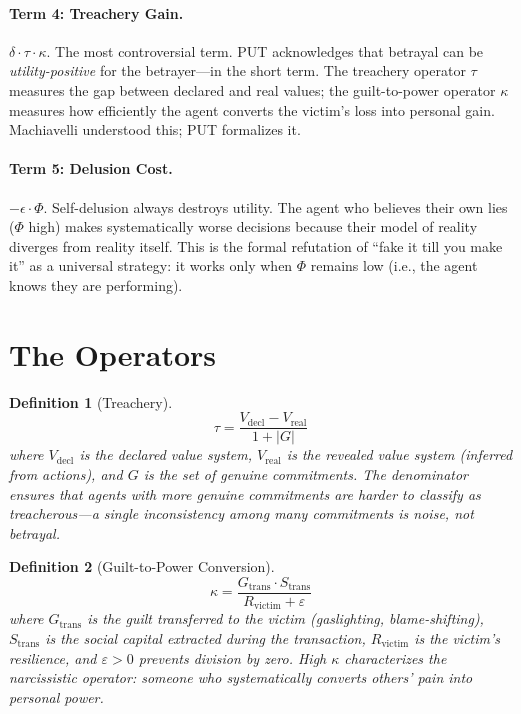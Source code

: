 \documentclass[12pt, a4paper]{article}
\newtheorem{definition}{Definition}[section]
\theoremstyle{remark}
\begin{document}
\paragraph{Term 4: Treachery Gain.}
$\delta \cdot \tau \cdot \kappa$. The most controversial term. PUT
acknowledges that betrayal can be \emph{utility-positive} for the
betrayer---in the short term. The treachery operator $\tau$ measures the
gap between declared and real values; the guilt-to-power operator $\kappa$
measures how efficiently the agent converts the victim's loss into personal
gain. Machiavelli understood this; PUT formalizes it.

\paragraph{Term 5: Delusion Cost.}
$-\epsilon \cdot \Phi$. Self-delusion always destroys utility. The agent
who believes their own lies ($\Phi$ high) makes systematically worse
decisions because their model of reality diverges from reality itself.
This is the formal refutation of ``fake it till you make it'' as a
universal strategy: it works only when $\Phi$ remains low (i.e., the
agent knows they are performing).

\section{The Operators}

\begin{definition}[Treachery]\label{def:treachery}
\begin{equation}
    \tau = \frac{V_{\text{decl}} - V_{\text{real}}}{1 + |G|}
\end{equation}
where $V_{\text{decl}}$ is the declared value system, $V_{\text{real}}$
is the revealed value system (inferred from actions), and $G$ is the
set of genuine commitments. The denominator ensures that agents with
more genuine commitments are harder to classify as treacherous---a
single inconsistency among many commitments is noise, not betrayal.
\end{definition}

\begin{definition}[Guilt-to-Power Conversion]\label{def:kappa}
\begin{equation}
    \kappa = \frac{G_{\text{trans}} \cdot S_{\text{trans}}}{R_{\text{victim}} + \varepsilon}
\end{equation}
where $G_{\text{trans}}$ is the guilt transferred to the victim (gaslighting,
blame-shifting), $S_{\text{trans}}$ is the social capital extracted during
the transaction, $R_{\text{victim}}$ is the victim's resilience, and
$\varepsilon > 0$ prevents division by zero. High $\kappa$ characterizes
the narcissistic operator: someone who \emph{systematically} converts
others' pain into personal power.
\end{definition}
\end{document}
